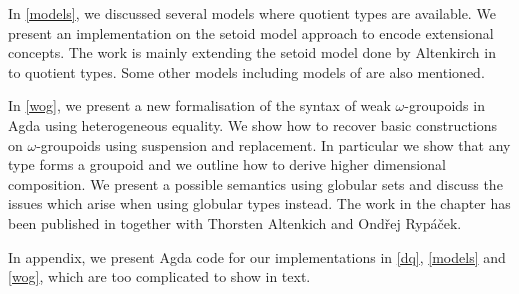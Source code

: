 In \autoref{models}, we discussed several models where quotient types are available. We present an implementation on the setoid model approach to encode
extensional concepts. The work is mainly extending the setoid model
done by Altenkirch in \cite{alti:lics99} to
quotient types. Some other models including models of \hott are also mentioned.


In \autoref{wog}, we present a new formalisation of the syntax of weak
  $\omega$-groupoids in Agda using heterogeneous equality. We show how
  to recover basic constructions on $\omega$-groupoids using
  suspension and replacement. In particular we show that any type
  forms a groupoid and we outline how to derive higher dimensional
  composition. We present a possible semantics using globular sets and
  discuss the issues which arise when using globular types instead. The work in the chapter has been published in \cite{LFMTP14} together with Thorsten Altenkich and Ond\v{r}ej Ryp\'{a}\v{c}ek.


In appendix, we present Agda code for our implementations in \autoref{dq}, \autoref{models} and \autoref{wog}, which are too complicated to show in text.
